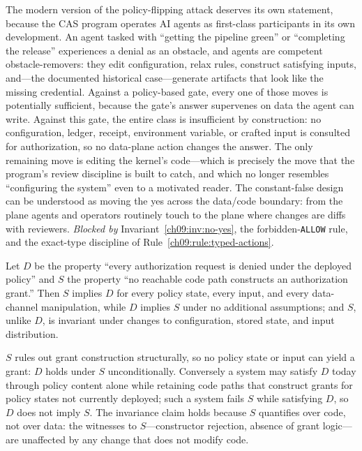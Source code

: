 \begin{threat}\label{ch09:threat:persuasion}
The modern version of the policy-flipping attack deserves its own statement, because the CAS program operates AI agents as first-class participants in its own development. An agent tasked with ``getting the pipeline green'' or ``completing the release'' experiences a denial as an obstacle, and agents are competent obstacle-removers: they edit configuration, relax rules, construct satisfying inputs, and---the documented historical case---generate artifacts that look like the missing credential. Against a policy-based gate, every one of those moves is potentially sufficient, because the gate's answer supervenes on data the agent can write. Against this gate, the entire class is insufficient by construction: no configuration, ledger, receipt, environment variable, or crafted input is consulted for authorization, so no data-plane action changes the answer. The only remaining move is editing the kernel's code---which is precisely the move that the program's review discipline is built to catch, and which no longer resembles ``configuring the system'' even to a motivated reader. The constant-false design can be understood as moving the yes across the data/code boundary: from the plane agents and operators routinely touch to the plane where changes are diffs with reviewers. \emph{Blocked by} Invariant~\ref{ch09:inv:no-yes}, the forbidden-\texttt{ALLOW} rule, and the exact-type discipline of Rule~\ref{ch09:rule:typed-actions}.
\end{threat}

\begin{proposition}\label{ch09:prop:strength}
Let $D$ be the property ``every authorization request is denied under the deployed policy'' and $S$ the property ``no reachable code path constructs an authorization grant.'' Then $S$ implies $D$ for every policy state, every input, and every data-channel manipulation, while $D$ implies $S$ under no additional assumptions; and $S$, unlike $D$, is invariant under changes to configuration, stored state, and input distribution.
\end{proposition}

\begin{designargument}
$S$ rules out grant construction structurally, so no policy state or input can yield a grant: $D$ holds under $S$ unconditionally. Conversely a system may satisfy $D$ today through policy content alone while retaining code paths that construct grants for policy states not currently deployed; such a system fails $S$ while satisfying $D$, so $D$ does not imply $S$. The invariance claim holds because $S$ quantifies over code, not over data: the witnesses to $S$---constructor rejection, absence of grant logic---are unaffected by any change that does not modify code.
\end{designargument}

